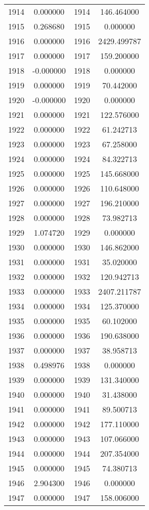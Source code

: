 \documentclass[12pt]{article}
\begin{document}
\begin{longtable}{@{}cccc@{}}
1914 & 0.000000 & 1914 & 146.464000 \\
1915 & 0.268680 & 1915 & 0.000000 \\
1916 & 0.000000 & 1916 & 2429.499787 \\
1917 & 0.000000 & 1917 & 159.200000 \\
1918 & -0.000000 & 1918 & 0.000000 \\
1919 & 0.000000 & 1919 & 70.442000 \\
1920 & -0.000000 & 1920 & 0.000000 \\
1921 & 0.000000 & 1921 & 122.576000 \\
1922 & 0.000000 & 1922 & 61.242713 \\
1923 & 0.000000 & 1923 & 67.258000 \\
1924 & 0.000000 & 1924 & 84.322713 \\
1925 & 0.000000 & 1925 & 145.668000 \\
1926 & 0.000000 & 1926 & 110.648000 \\
1927 & 0.000000 & 1927 & 196.210000 \\
1928 & 0.000000 & 1928 & 73.982713 \\
1929 & 1.074720 & 1929 & 0.000000 \\
1930 & 0.000000 & 1930 & 146.862000 \\
1931 & 0.000000 & 1931 & 35.020000 \\
1932 & 0.000000 & 1932 & 120.942713 \\
1933 & 0.000000 & 1933 & 2407.211787 \\
1934 & 0.000000 & 1934 & 125.370000 \\
1935 & 0.000000 & 1935 & 60.102000 \\
1936 & 0.000000 & 1936 & 190.638000 \\
1937 & 0.000000 & 1937 & 38.958713 \\
1938 & 0.498976 & 1938 & 0.000000 \\
1939 & 0.000000 & 1939 & 131.340000 \\
1940 & 0.000000 & 1940 & 31.438000 \\
1941 & 0.000000 & 1941 & 89.500713 \\
1942 & 0.000000 & 1942 & 177.110000 \\
1943 & 0.000000 & 1943 & 107.066000 \\
1944 & 0.000000 & 1944 & 207.354000 \\
1945 & 0.000000 & 1945 & 74.380713 \\
1946 & 2.904300 & 1946 & 0.000000 \\
1947 & 0.000000 & 1947 & 158.006000 \\

\end{longtable}
\end{document}

